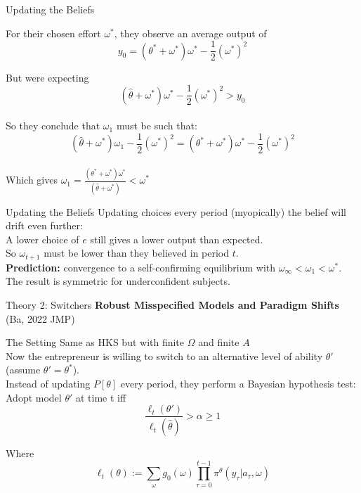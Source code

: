 \documentclass[aspectratio=169]{beamer}
\begin{document}
\begin{frame}{Updating the Beliefs}

For their chosen effort $\omega^*$, they observe an average output of 
$$ y_0=(\theta^* + \omega^*)\omega^*-\frac{1}{2}(\omega^*)^2 $$

But were expecting
$$ (\hat\theta + \omega^*)\omega^*-\frac{1}{2}(\omega^*)^2 > y_0$$\\
\bigskip
\pause
So they conclude that $\omega_1$ must be such that:
$$(\hat \theta + \omega^*)\omega_1-\frac{1}{2}(\omega^*)^2 = (\theta^* + \omega^*)\omega^*-\frac{1}{2}(\omega^*)^2 $$\\
\bigskip 
Which gives $\omega_1 = \frac{(\theta^* + \omega^*)\omega^*}{(\hat \theta + \omega^*)}<\omega^*$
    
\end{frame}

\begin{frame}{Updating the Beliefs}
    Updating choices every period (myopically) the belief will drift even further:\\
    \bigskip
    A lower choice of $e$ still gives a lower output than expected. \\
    \bigskip
    So $\omega_{t+1}$ must be lower than they believed in period $t$.\\
    \bigskip
    \textbf{Prediction:} convergence to a self-confirming equilibrium with $\omega_\infty<\omega_1<\omega^*.$\\
    \bigskip
    The result is symmetric for underconfident subjects.
    
\end{frame}


\begin{frame}{Theory 2: Switchers}
    \Large\textbf{ Robust Misspecified Models and Paradigm Shifts \\}
    (Ba, 2022 JMP)
\end{frame}


\begin{frame}{The Setting}
    Same as HKS but with finite $\Omega$ and finite $A$\\
    \bigskip
    Now the entrepreneur is willing to switch to an alternative level of ability $\theta'$ (assume $\theta' = \theta^*$).\\
    \bigskip
    Instead of updating $P[\theta]$ every period, they perform a Bayesian hypothesis test:\\
    \bigskip
    Adopt model $\theta'$ at time t iff \\
    $$\frac{\ell_t (\theta')}{\ell_t(\hat{\theta})}>\alpha\geq1$$

    Where $$\ell_t(\theta) := \sum_{\omega}g_0(\omega)\prod_{\tau=0}^{t-1}\pi^\theta(y_\tau|a_\tau, \omega)$$
  
\end{frame}
\end{document}
